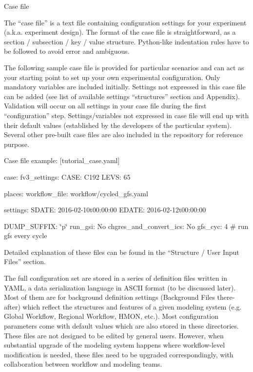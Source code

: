 Case file

The “case file” is a text file containing configuration settings for your experiment (a.\-k.\-a. experiment design). The format of the case file is straightforward, as a section / subsection / key / value structure. Python-\/like indentation rules have to be followed to avoid error and ambiguous.

The following sample case file is provided for particular scenarios and can act as your starting point to set up your own experimental configuration. Only mandatory variables are included initially. Settings not expressed in this case file can be added (see list of available settings “structures” section and Appendix). Validation will occur on all settings in your case file during the first “configuration” step. Settings/variables not expressed in case file will end up with their default values (established by the developers of the particular system). Several other pre-\/built case files are also included in the repository for reference purpose.

Case file example\-: \mbox{[}tutorial\-\_\-case.\-yaml\mbox{]}

case\-: fv3\-\_\-settings\-: C\-A\-S\-E\-: C192 L\-E\-V\-S\-: 65

places\-: workflow\-\_\-file\-: workflow/cycled\-\_\-gfs.\-yaml

settings\-: S\-D\-A\-T\-E\-: 2016-\/02-\/10t00\-:00\-:00 E\-D\-A\-T\-E\-: 2016-\/02-\/12t00\-:00\-:00

D\-U\-M\-P\-\_\-\-S\-U\-F\-F\-I\-X\-: \char`\"{}p\char`\"{} run\-\_\-gsi\-: No chgres\-\_\-and\-\_\-convert\-\_\-ics\-: No gfs\-\_\-cyc\-: 4 \# run gfs every cycle

Detailed explanation of these files can be found in the “\-Structure / User Input Files” section.

The full configuration set are stored in a series of definition files written in Y\-A\-M\-L, a data serialization language in A\-S\-C\-I\-I format (to be discussed later). Most of them are for background definition settings (Background Files there-\/after) which reflect the structures and features of a given modeling system (e.\-g. Global Workflow, Regional Workflow, H\-M\-O\-N, etc.). Most configuration parameters come with default values which are also stored in these directories. These files are not designed to be edited by general users. However, when substantial upgrade of the modeling system happens where workflow-\/level modification is needed, these files need to be upgraded correspondingly, with collaboration between workflow and modeling teams.

